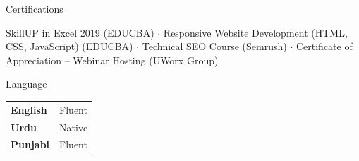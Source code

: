 \documentclass{resume} %
\begin{document}
\begin{rSection}{Certifications}

\item \small SkillUP in Excel 2019 (EDUCBA) $\cdot$ Responsive Website Development (HTML, CSS, JavaScript) (EDUCBA) $\cdot$ Technical SEO Course (Semrush) $\cdot$ Certificate of Appreciation – Webinar Hosting (UWorx Group)

\end{rSection}
\begin{rSection}{Language} 

\begin{tabular}{@{}l l@{}}
\textbf{English} & Fluent \\
\textbf{Urdu} & Native \\
\textbf{Punjabi} & Fluent \\
\end{tabular}

\end{rSection}
\end{document}
